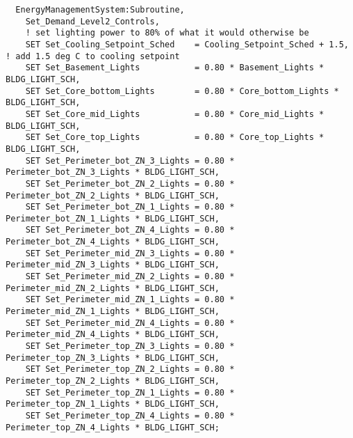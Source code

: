 \begin{lstlisting}
  EnergyManagementSystem:Subroutine,
    Set_Demand_Level2_Controls,
    ! set lighting power to 80% of what it would otherwise be
    SET Set_Cooling_Setpoint_Sched    = Cooling_Setpoint_Sched + 1.5, ! add 1.5 deg C to cooling setpoint
    SET Set_Basement_Lights           = 0.80 * Basement_Lights * BLDG_LIGHT_SCH,
    SET Set_Core_bottom_Lights        = 0.80 * Core_bottom_Lights * BLDG_LIGHT_SCH,
    SET Set_Core_mid_Lights           = 0.80 * Core_mid_Lights * BLDG_LIGHT_SCH,
    SET Set_Core_top_Lights           = 0.80 * Core_top_Lights * BLDG_LIGHT_SCH,
    SET Set_Perimeter_bot_ZN_3_Lights = 0.80 * Perimeter_bot_ZN_3_Lights * BLDG_LIGHT_SCH,
    SET Set_Perimeter_bot_ZN_2_Lights = 0.80 * Perimeter_bot_ZN_2_Lights * BLDG_LIGHT_SCH,
    SET Set_Perimeter_bot_ZN_1_Lights = 0.80 * Perimeter_bot_ZN_1_Lights * BLDG_LIGHT_SCH,
    SET Set_Perimeter_bot_ZN_4_Lights = 0.80 * Perimeter_bot_ZN_4_Lights * BLDG_LIGHT_SCH,
    SET Set_Perimeter_mid_ZN_3_Lights = 0.80 * Perimeter_mid_ZN_3_Lights * BLDG_LIGHT_SCH,
    SET Set_Perimeter_mid_ZN_2_Lights = 0.80 * Perimeter_mid_ZN_2_Lights * BLDG_LIGHT_SCH,
    SET Set_Perimeter_mid_ZN_1_Lights = 0.80 * Perimeter_mid_ZN_1_Lights * BLDG_LIGHT_SCH,
    SET Set_Perimeter_mid_ZN_4_Lights = 0.80 * Perimeter_mid_ZN_4_Lights * BLDG_LIGHT_SCH,
    SET Set_Perimeter_top_ZN_3_Lights = 0.80 * Perimeter_top_ZN_3_Lights * BLDG_LIGHT_SCH,
    SET Set_Perimeter_top_ZN_2_Lights = 0.80 * Perimeter_top_ZN_2_Lights * BLDG_LIGHT_SCH,
    SET Set_Perimeter_top_ZN_1_Lights = 0.80 * Perimeter_top_ZN_1_Lights * BLDG_LIGHT_SCH,
    SET Set_Perimeter_top_ZN_4_Lights = 0.80 * Perimeter_top_ZN_4_Lights * BLDG_LIGHT_SCH;





\end{lstlisting}
